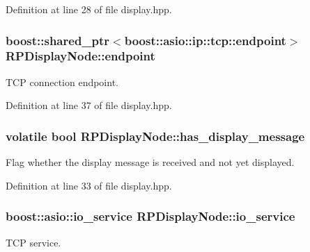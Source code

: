\-Definition at line 28 of file display.\-hpp.

\hypertarget{class_r_p_display_node_a80dac975875a0312b0f813acce43ff0b}{
\subsubsection[{endpoint}]{\setlength{\rightskip}{0pt plus 5cm}boost\-::shared\-\_\-ptr$<$boost\-::asio\-::ip\-::tcp\-::endpoint$>$ {\bf \-R\-P\-Display\-Node\-::endpoint}}}\label{class_r_p_display_node_a80dac975875a0312b0f813acce43ff0b}
\-T\-C\-P connection endpoint. 

\-Definition at line 37 of file display.\-hpp.

\hypertarget{class_r_p_display_node_abc112853a66daeeb45152d29772a8679}{
\subsubsection[{has\-\_\-display\-\_\-message}]{\setlength{\rightskip}{0pt plus 5cm}volatile bool {\bf \-R\-P\-Display\-Node\-::has\-\_\-display\-\_\-message}}}\label{class_r_p_display_node_abc112853a66daeeb45152d29772a8679}
\-Flag whether the display message is received and not yet displayed. 

\-Definition at line 33 of file display.\-hpp.

\hypertarget{class_r_p_display_node_a4ab5252d168833e5e957ed6fe09b9ebb}{
\subsubsection[{io\-\_\-service}]{\setlength{\rightskip}{0pt plus 5cm}boost\-::asio\-::io\-\_\-service {\bf \-R\-P\-Display\-Node\-::io\-\_\-service}}}\label{class_r_p_display_node_a4ab5252d168833e5e957ed6fe09b9ebb}
\-T\-C\-P service. 

